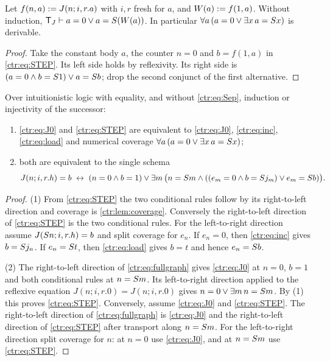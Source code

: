 \begin{lemma}\label{ctr:lem:coverage}
Let $f(n,a)\mathrel{:=} J(n;i,r.a)$ with $i,r$ fresh for $a$, and $W(a)\mathrel{:=} f(1,a)$. Without
induction, $\mathsf T_J\vdash a=0\lor a=S(W(a))$. In particular
$\forall a\,(a=0\lor\exists x\,a=S x)$ is derivable.
\end{lemma}
\begin{proof}
Take the constant body $a$, the counter $n=0$ and $b=f(1,a)$ in \eqref{ctr:eq:STEP}. Its
left side holds by reflexivity. Its right side is $(a=0\land b=S 1)\lor a=S b$; drop
the second conjunct of the first alternative.
\end{proof}

\begin{proposition}\label{ctr:prop:step}
Over intuitionistic logic with equality, and without \eqref{ctr:eq:Sep}, induction or
injectivity of the successor:
\begin{enumerate}
\item \eqref{ctr:eq:J0} and \eqref{ctr:eq:STEP} are equivalent to \eqref{ctr:eq:J0},
\eqref{ctr:eq:inc}, \eqref{ctr:eq:load} and numerical coverage
$\forall a\,(a=0\lor\exists x\,a=S x)$;
\item both are equivalent to the single schema
\begin{equation}\label{ctr:eq:fullgraph}
 J(n;i,r.h)=b\;\leftrightarrow\;
 (n=0\land b=1)\lor\exists m\,\bigl(n=S m\land
   ((e_m=0\land b=S j_m)\lor e_m=S b)\bigr).
\end{equation}
\end{enumerate}
\end{proposition}
\begin{proof}
(1) From \eqref{ctr:eq:STEP} the two conditional rules follow by its right-to-left
direction and coverage is \cref{ctr:lem:coverage}. Conversely the right-to-left direction of
\eqref{ctr:eq:STEP} is the two conditional rules. For the left-to-right direction assume
$J(S n;i,r.h)=b$ and split coverage for $e_n$. If $e_n=0$, then \eqref{ctr:eq:inc} gives
$b=S j_n$. If $e_n=S t$, then \eqref{ctr:eq:load} gives $b=t$ and hence $e_n=S b$.

(2) %
The right-to-left direction of \eqref{ctr:eq:fullgraph} gives \eqref{ctr:eq:J0} at
$n=0$, $b=1$ and both conditional rules at $n=S m$. Its left-to-right direction applied
to the reflexive equation $J(n;i,r.0)=J(n;i,r.0)$ gives $n=0\lor\exists m\,n=S m$. By
(1) this proves \eqref{ctr:eq:STEP}. Conversely, assume \eqref{ctr:eq:J0} and
\eqref{ctr:eq:STEP}. The right-to-left direction of \eqref{ctr:eq:fullgraph} is
\eqref{ctr:eq:J0} and the right-to-left direction of \eqref{ctr:eq:STEP} after transport
along $n=S m$. For the left-to-right direction split coverage for $n$: at $n=0$ use
\eqref{ctr:eq:J0}, and at $n=S m$ use \eqref{ctr:eq:STEP}.
\end{proof}

